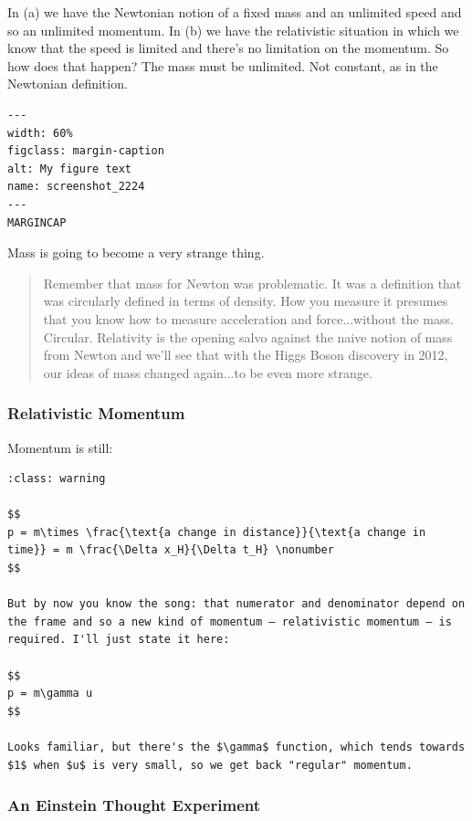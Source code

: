 \documentclass[
]{article}
\begin{document}
In (a) we have the Newtonian notion of a fixed mass and an unlimited
speed and so an unlimited momentum. In (b) we have the relativistic
situation in which we know that the speed is limited and there's no
limitation on the momentum. So how does that happen? The mass must be
unlimited. Not constant, as in the Newtonian definition.

\begin{verbatim}
---
width: 60%
figclass: margin-caption
alt: My figure text
name: screenshot_2224
---
MARGINCAP
\end{verbatim}

Mass is going to become a very strange thing.

\begin{quote}
Remember that mass for Newton was problematic. It was a definition that
was circularly defined in terms of density. How you measure it presumes
that you know how to measure acceleration and force...without the mass.
Circular. Relativity is the opening salvo against the naive notion of
mass from Newton and we'll see that with the Higgs Boson discovery in
2012, our ideas of mass changed again...to be even more strange.
\end{quote}

\hypertarget{relativistic-momentum}{%
\subsubsection{Relativistic Momentum}\label{relativistic-momentum}}

Momentum is still:

\begin{verbatim}
:class: warning

$$
p = m\times \frac{\text{a change in distance}}{\text{a change in time}} = m \frac{\Delta x_H}{\Delta t_H} \nonumber
$$

But by now you know the song: that numerator and denominator depend on the frame and so a new kind of momentum – relativistic momentum – is required. I'll just state it here:

$$
p = m\gamma u
$$

Looks familiar, but there's the $\gamma$ function, which tends towards $1$ when $u$ is very small, so we get back "regular" momentum.
\end{verbatim}

\hypertarget{an-einstein-thought-experiment}{%
\subsubsection{An Einstein Thought
Experiment}\label{an-einstein-thought-experiment}}
\end{document}

